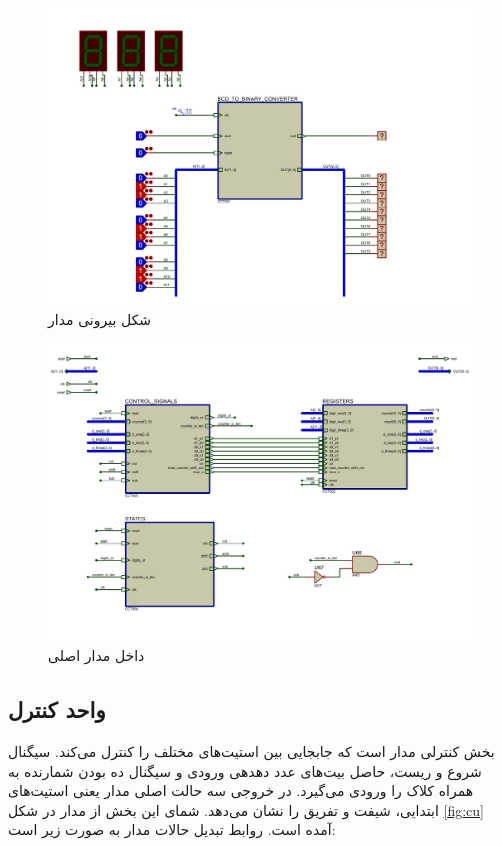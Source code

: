 \documentclass{article}
\begin{document}
\begin{figure}
	\centering
	\includegraphics[scale=0.4]{./graphics/DecimalToBinaryConverter}
	\caption{شکل بیرونی مدار}
	\label{fig:outside}
\end{figure}

\begin{figure}
	\centering
	\includegraphics[scale=0.4]{./graphics/main}
	\caption{داخل مدار اصلی}
	\label{fig:main}
\end{figure}


\subsection{واحد کنترل}

بخش کنترلی مدار است که جابجایی بین استیت‌های مختلف را کنترل می‌کند. سیگنال شروع و ریست، حاصل  بیت‌های عدد دهدهی ورودی و سیگنال ده بودن شمارنده به همراه کلاک را ورودی می‌گیرد. در خروجی سه حالت اصلی مدار یعنی استیت‌های ابتدایی، شیفت و تفریق را نشان می‌دهد. شمای این بخش از مدار در شکل \ref{fig:cu} آمده است. روابط تبدیل حالات مدار به صورت زیر است:
\end{document}
